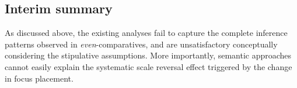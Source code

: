\documentclass[12pt,letterpaper]{scrartcl}
\newcommand{\sub}[1]{\textsubscript{#1}}
\newcommand{\todo}[1]{{\color{magenta} #1}}
\begin{document}



\subsection{Interim summary}

As discussed above, the existing analyses fail to capture the complete inference patterns observed in \textit{even}-comparatives, and are unsatisfactory conceptually considering the stipulative assumptions. More importantly, semantic approaches cannot easily explain the systematic scale reversal effect triggered by the change in focus placement. 
\end{document}
